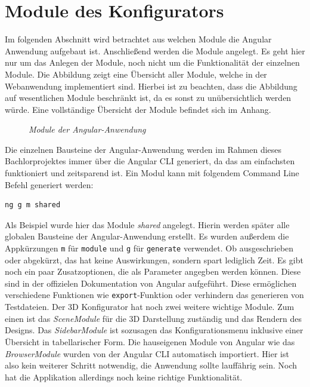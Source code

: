 \section{Module des Konfigurators}
\label{sec:umsetzung}
%
Im folgenden Abschnitt wird betrachtet aus welchen Module die Angular Anwendung aufgebaut ist. Anschließend werden die Module angelegt. Es geht hier nur um das Anlegen der Module, noch nicht um die Funktionalität der einzelnen Module. Die Abbildung zeigt eine Übersicht aller Module, welche in der Webanwendung implementiert sind. Hierbei ist zu beachten, dass die Abbildung auf wesentlichen Module beschränkt ist, da es sonst zu unübersichtlich werden würde. Eine vollständige Übersicht der Module befindet sich im Anhang.
\begin{figure}[h]
	\centering
	{}
	\caption[Übersicht der Module]{\textit{Module der Angular-Anwendung}}
	\label{fig:module}
\end{figure}
Die einzelnen Bausteine der Angular-Anwendung werden im Rahmen dieses Bachlorprojektes immer über die Angular CLI generiert, da das am einfachsten funktioniert und zeitsparend ist. Ein Modul kann mit folgendem Command Line Befehl generiert werden:
%
\begin{lstlisting}[caption={Erstellen eines Modules mittels Angular CLI},label=lst:genmodule]
ng g m shared
\end{lstlisting}
%
Als Beispiel wurde hier das Module \textit{shared} angelegt. Hierin werden später alle globalen Bausteine der Angular-Anwendung erstellt. Es wurden außerdem die Appkürzungen \texttt{m} für \texttt{module} und \texttt{g} für \texttt{generate} verwendet. Ob ausgeschrieben oder abgekürzt, das hat keine Auswirkungen, sondern spart lediglich Zeit. Es gibt noch ein paar Zusatzoptionen, die als Parameter angegben werden können. Diese sind in der offizielen Dokumentation von Angular aufgeführt. Diese ermöglichen verschiedene Funktionen wie \texttt{export}-Funktion oder verhindern das generieren von Testdateien. Der 3D Konfigurator hat noch zwei weitere wichtige Module. Zum einen ist das \textit{SceneModule} für die 3D Darstellung zuständig und das Rendern des Designs. Das \textit{SidebarModule} ist sozusagen das Konfigurationsmenu inklusive einer Übersicht in tabellarischer Form. Die hauseigenen Module von Angular wie das \textit{BrowserModule} wurden von der Angular CLI automatisch importiert. Hier ist also kein weiterer Schritt notwendig, die Anwendung sollte lauffährig sein. Noch hat die Applikation allerdings noch keine richtige Funktionalität.
%
